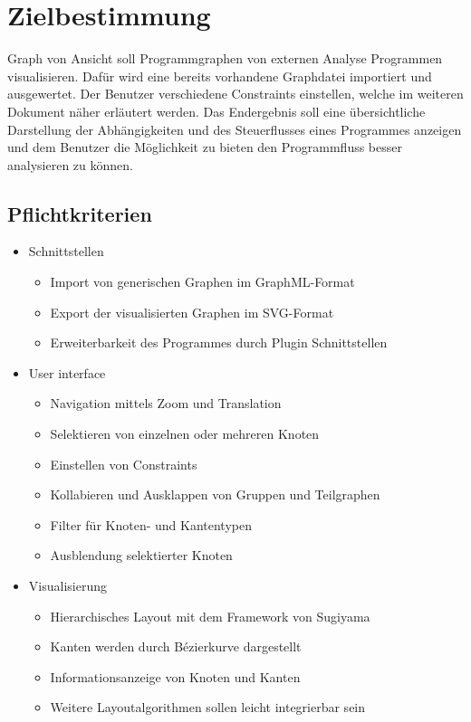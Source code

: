\chapter{Zielbestimmung}

Graph von Ansicht soll Programmgraphen von externen Analyse Programmen visualisieren. Dafür wird eine bereits vorhandene Graphdatei importiert und ausgewertet. Der Benutzer verschiedene Constraints einstellen, welche im weiteren Dokument näher erläutert werden. 
Das Endergebnis soll eine übersichtliche Darstellung der Abhängigkeiten und des Steuerflusses eines Programmes anzeigen und dem Benutzer die Möglichkeit zu bieten den Programmfluss besser analysieren zu können.

\section{Pflichtkriterien}

\begin{itemize}
\item Schnittstellen
\begin{itemize}
\item Import von generischen Graphen im GraphML-Format
\item Export der visualisierten Graphen im SVG-Format
\item Erweiterbarkeit des Programmes durch Plugin Schnittstellen
\end{itemize}
\item User interface
\begin{itemize}
\item Navigation mittels Zoom und Translation
\item Selektieren von einzelnen oder mehreren Knoten
\item Einstellen von Constraints
\item Kollabieren und Ausklappen von Gruppen und Teilgraphen
\item Filter für Knoten- und Kantentypen
\item Ausblendung selektierter Knoten
\end{itemize}
\item Visualisierung
\begin{itemize}
\item Hierarchisches Layout mit dem Framework von Sugiyama
\item Kanten werden durch Bézierkurve dargestellt
\item Informationsanzeige von Knoten und Kanten
\item Weitere Layoutalgorithmen sollen leicht integrierbar sein 
\end{itemize}
\end{itemize}

